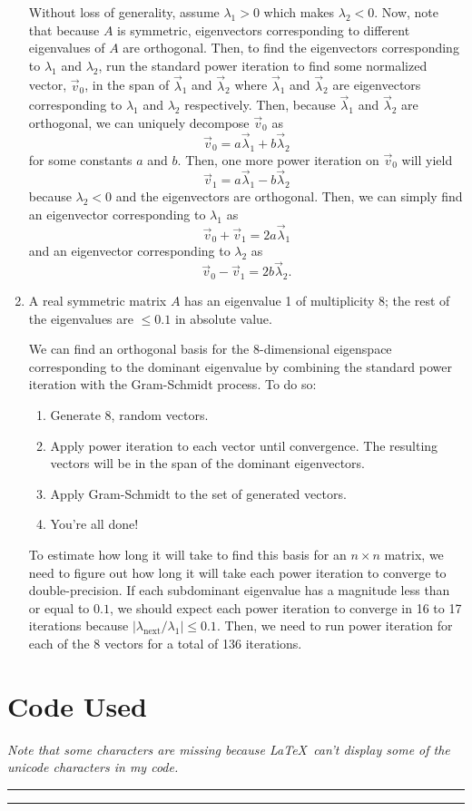 \documentclass[a4paper,12pt]{article}
\newcommand{\abs}[1]{\left| #1 \right|}
\begin{document}
\begin{enumerate}[label = (\arabic*)]
	Without loss of generality, assume $ \lambda_1 > 0 $ which makes $ \lambda_2 < 0 $. Now, note that because $ A $ is symmetric, eigenvectors corresponding to different eigenvalues of $ A $ are orthogonal. Then, to find the eigenvectors corresponding to $ \lambda_1 $ and $ \lambda_2 $, run the standard power iteration to find some normalized vector, $ \vec{v}_0 $, in the span of $ \vec{\lambda}_1 $ and $ \vec{\lambda}_2 $ where $ \vec{\lambda}_1 $ and $ \vec{\lambda}_2 $ are eigenvectors corresponding to $ \lambda_1 $ and $ \lambda_2 $ respectively. Then, because $ \vec{\lambda}_1 $ and $ \vec{\lambda}_2 $ are orthogonal, we can uniquely decompose $ \vec{v}_0 $ as 
	\[
		\vec{v}_0 = a \vec{\lambda}_1 + b \vec{\lambda}_2
	\]
	for some constants $ a $ and $ b $. Then, one more power iteration on $ \vec{v}_0 $ will yield
	\[
		\vec{v}_1 = a \vec{\lambda}_1 - b \vec{\lambda}_2
	\]
	because $ \lambda_2 < 0 $ and the eigenvectors are orthogonal. Then, we can simply find an eigenvector corresponding to $ \lambda_1 $ as
	\[
		\vec{v}_0 + \vec{v}_1 = 2a \vec{\lambda}_1
	\]
	and an eigenvector corresponding to $ \lambda_2 $ as 
	\[
		\vec{v}_0 - \vec{v}_1 = 2b \vec{\lambda}_2.
 	\]
 	
 	\newpage
 	\item A real symmetric matrix $ A $ has an eigenvalue 1 of multiplicity $ 8 $; the rest of the eigenvalues are $ \leq 0.1 $ in absolute value.
 	
 	We can find an orthogonal basis for the $ 8 $-dimensional eigenspace corresponding to the dominant eigenvalue by combining the standard power iteration with the Gram-Schmidt process. To do so:
 	
 	\begin{enumerate}[label = (\roman*)]
 		\item Generate 8, random vectors.
 		\item Apply power iteration to each vector until convergence. The resulting vectors will be in the span of the dominant eigenvectors.
 		\item Apply Gram-Schmidt to the set of generated vectors.
 		\item You're all done!
 	\end{enumerate}
 	
 	To estimate how long it will take to find this basis for an $ n \times n $ matrix, we need to figure out how long it will take each power iteration to converge to double-precision. If each subdominant eigenvalue has a magnitude less than or equal to $ 0.1 $, we should expect each power iteration to converge in 16 to 17 iterations because $ \abs{\lambda_{\text{next}} /
 	\lambda_1} \leq 0.1 $. Then, we need to run power iteration for each of the 8 vectors for a total of 136 iterations.
\end{enumerate}

\newpage
\section*{Code Used}\label{sec:code}
\emph{Note that some characters are missing because \LaTeX\ can't display some of the unicode characters in my code.}

\rule{\textwidth}{0.4pt}
	
\rule{\textwidth}{0.4pt}
\end{document}
